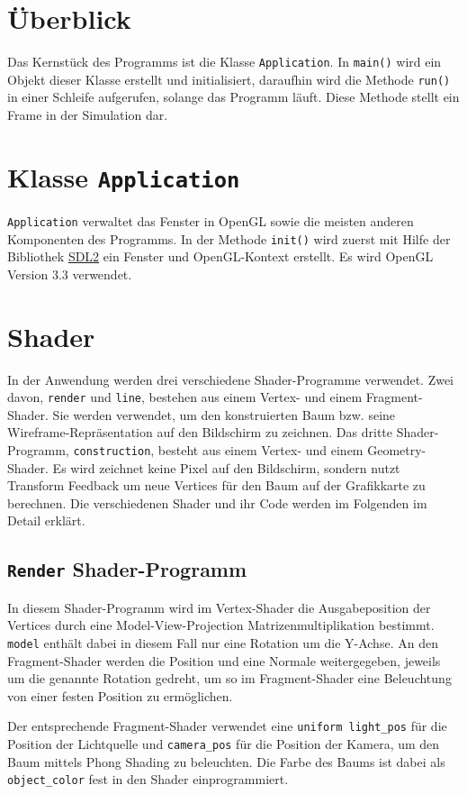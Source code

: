 \chapter{Überblick}
Das Kernstück des Programms ist die Klasse \lstinline{Application}. In \lstinline{main()} wird ein Objekt dieser Klasse erstellt und initialisiert, daraufhin wird die Methode \lstinline{run()} in einer Schleife aufgerufen, solange das Programm läuft. Diese Methode stellt ein Frame in der Simulation dar. 

\chapter{Klasse \lstinline{Application}}
\lstinline{Application} verwaltet das Fenster in OpenGL sowie die meisten anderen Komponenten des Programms. In der Methode \lstinline{init()} wird zuerst mit Hilfe der Bibliothek \href{https://www.libsdl.org/}{SDL2} ein Fenster und OpenGL-Kontext erstellt. Es wird OpenGL Version 3.3 verwendet. 

\chapter{Shader}
In der Anwendung werden drei verschiedene Shader-Programme verwendet. Zwei davon, \lstinline{render} und \lstinline{line}, bestehen aus einem Vertex- und einem Fragment-Shader. Sie werden verwendet, um den konstruierten Baum bzw. seine Wireframe-Repräsentation auf den Bildschirm zu zeichnen. Das dritte Shader-Programm, \lstinline{construction}, besteht aus einem Vertex- und einem Geometry-Shader. Es wird zeichnet keine Pixel auf den Bildschirm, sondern nutzt Transform Feedback um neue Vertices für den Baum auf der Grafikkarte zu berechnen. Die verschiedenen Shader und ihr Code werden im Folgenden im Detail erklärt.

\section{\lstinline{Render} Shader-Programm}
In diesem Shader-Programm wird im Vertex-Shader die Ausgabeposition der Vertices durch eine Model-View-Projection Matrizenmultiplikation bestimmt. \lstinline{model} enthält dabei in diesem Fall nur eine Rotation um die Y-Achse. An den Fragment-Shader werden die Position und eine Normale weitergegeben, jeweils um die genannte Rotation gedreht, um so im Fragment-Shader eine Beleuchtung von einer festen Position zu ermöglichen.

Der entsprechende Fragment-Shader verwendet eine \lstinline{uniform light_pos} für die Position der Lichtquelle und \lstinline{camera_pos} für die Position der Kamera, um den Baum mittels Phong Shading zu beleuchten. Die Farbe des Baums ist dabei als \lstinline{object_color} fest in den Shader einprogrammiert.

